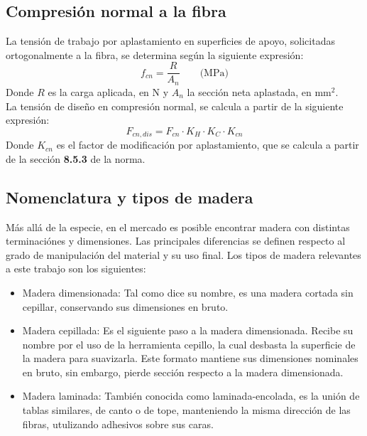 \subsection{Compresión normal a la fibra}
La tensión de trabajo por aplastamiento en superficies de apoyo, solicitadas ortogonalmente a la fibra, se determina según la siguiente expresión:
\begin{equation}
	f_{cn}= \frac{R}{A_n} \qquad \text{(MPa)}
\end{equation}
Donde $R$ es la carga aplicada, en N y $A_n$ la sección neta aplastada, en mm$^2$.
\\
La tensión de diseño en compresión normal, se calcula a partir de la siguiente expresión:
\begin{equation}
	F_{cn,dis} = F_{cn} \cdot K_H \cdot K_C \cdot K_{cn}
\end{equation}
Donde $K_{cn}$ es el factor de modificación por aplastamiento, que se calcula a partir de la sección \textbf{8.5.3} de la norma.


\subsection{Nomenclatura y tipos de madera}
Más allá de la especie, en el mercado es posible encontrar madera con distintas terminaciónes y dimensiones. Las principales diferencias se definen respecto al grado de manipulación del material y su uso final. Los tipos de madera relevantes a este trabajo son los siguientes:
\begin{itemize}
	\item Madera dimensionada: Tal como dice su nombre, es una madera cortada sin cepillar, conservando sus dimensiones en bruto.
	\item Madera cepillada: Es el siguiente paso a la madera dimensionada. Recibe su nombre por el uso de la herramienta cepillo, la cual desbasta la superficie de la madera para suavizarla. Este formato mantiene sus dimensiones nominales en bruto, sin embargo, pierde sección respecto a la madera dimensionada.
	\item Madera laminada: También conocida como laminada-encolada, es la unión de tablas similares, de canto o de tope, manteniendo la misma dirección de las fibras, utulizando adhesivos sobre sus caras.
\end{itemize}

